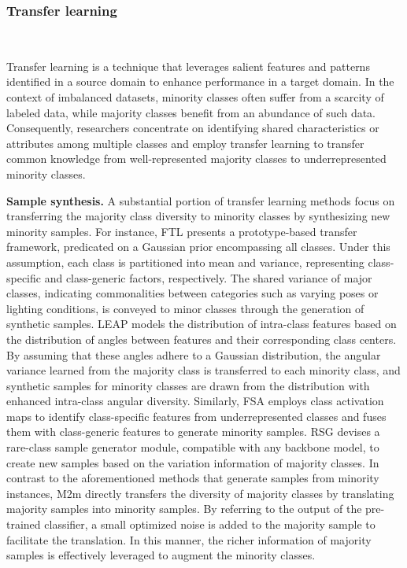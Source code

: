 \subsubsection{Transfer learning}\
\label{s325}

Transfer learning is a technique that leverages salient features and patterns identified in a source domain to enhance performance in a target domain. In the context of imbalanced datasets, minority classes often suffer from a scarcity of labeled data, while majority classes benefit from an abundance of such data. Consequently, researchers concentrate on identifying shared characteristics or attributes among multiple classes and employ transfer learning to transfer common knowledge from well-represented majority classes to underrepresented minority classes.

\textbf{Sample synthesis.}
A substantial portion of transfer learning methods focus on transferring the majority class diversity to minority classes by synthesizing new minority samples.
For instance, FTL \cite{yin2019feature} presents a prototype-based transfer framework, predicated on a Gaussian prior encompassing all classes. Under this assumption, each class is partitioned into mean and variance, representing class-specific and class-generic factors, respectively. The shared variance of major classes, indicating commonalities between categories such as varying poses or lighting conditions, is conveyed to minor classes through the generation of synthetic samples.
LEAP \cite{liu2020deep}models the distribution of intra-class features based on the distribution of angles between features and their corresponding class centers. By assuming that these angles adhere to a Gaussian distribution, the angular variance learned from the majority class is transferred to each minority class, and synthetic samples for minority classes are drawn from the distribution with enhanced intra-class angular diversity.
Similarly, FSA \cite{chu2020feature} employs class activation maps to identify class-specific features from underrepresented classes and fuses them with class-generic features to generate minority samples. RSG \cite{wang2021rsg} devises a rare-class sample generator module, compatible with any backbone model, to create new samples based on the variation information of majority classes.
In contrast to the aforementioned methods that generate samples from minority instances, M2m \cite{kim2020m2m} directly transfers the diversity of majority classes by translating majority samples into minority samples. By referring to the output of the pre-trained classifier, a small optimized noise is added to the majority sample to facilitate the translation. In this manner, the richer information of majority samples is effectively leveraged to augment the minority classes.


